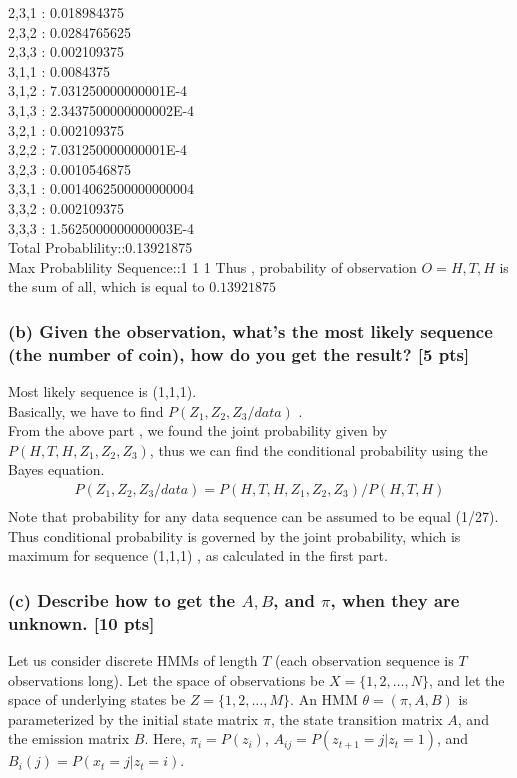 \documentclass[twoside,11pt]{article}\usepackage{amsmath,amsfonts,amsthm,fullpage}
\begin{document}
2,3,1 : 0.018984375\\
2,3,2 : 0.0284765625\\
2,3,3 : 0.002109375\\
3,1,1 : 0.0084375\\
3,1,2 : 7.031250000000001E-4\\
3,1,3 : 2.3437500000000002E-4\\
3,2,1 : 0.002109375\\
3,2,2 : 7.031250000000001E-4\\
3,2,3 : 0.0010546875\\
3,3,1 : 0.0014062500000000004\\
3,3,2 : 0.002109375\\
3,3,3 : 1.5625000000000003E-4\\
Total Probablility::0.13921875\\
Max Probablility Sequence::1 1 1
Thus , probability of observation $O = {H,T,H}$ is the sum of all, which is equal to $0.13921875$\\
\subsubsection*{(b) Given the observation, what's the most likely sequence (the number of coin), how do you get the result? [5 pts]}
Most likely sequence is (1,1,1). \\ Basically, we have to find $P(Z_1,Z_2,Z_3/ data)$ . \\
From the above part , we found the joint probability given by $P(H,T,H,Z_1,Z_2,Z_3)$, thus we can find the conditional probability using the Bayes equation.
\begin{equation}
\begin{split}
P(Z_1,Z_2,Z_3/ data)= P(H,T,H,Z_1,Z_2,Z_3)/P(H,T,H)\\
\end{split}
\end{equation}
Note that probability for any data sequence can be assumed to be equal (1/27). Thus conditional probability is governed by the joint probability, which is maximum for sequence (1,1,1) , as calculated in the first part.\\

\subsubsection*{(c) Describe how to get the $A, B$, and $\pi$, when they are unknown. [10 pts]} 

Let us consider discrete HMMs of length $T$ (each observation sequence is $T$ observations long). Let the space of observations be $X = \{1, 2, \ldots , N\}$, and let the space of underlying states be $Z = \{1, 2, \dots , M\}$. An HMM $\theta = (\pi, A, B)$ is parameterized by the initial state matrix $\pi$, the state transition matrix $A$, and the emission matrix $B$. Here, $\pi_i = P(z_i)$, $A_{ij} = P(z_{t+1} = j | z_t = 1)$, and $B_{i}(j) = P(x_t = j | z_t = i)$. \\
\end{document}
